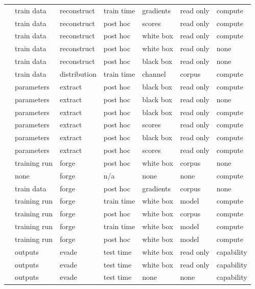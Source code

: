 \begin{landscape}
\begin{longtable}{rllllll}
\cite{BDJV22} & train data & reconstruct & train time & gradients & read only & compute \\
\cite{HU14} & train data & reconstruct & post hoc & scores & read only & compute \\
\cite{ML24} & train data & reconstruct & post hoc & white box & read only & compute \\
\cite{BCH22} & train data & reconstruct & post hoc & white box & read only & none \\
\cite{WLBZ25} & train data & reconstruct & post hoc & black box & read only & none \\
\cite{XSD24} & train data & distribution & train time & channel & corpus & compute \\
\cite{CCGJY19} & parameters & extract & post hoc & black box & read only & compute \\
\cite{SSEP24} & parameters & extract & post hoc & black box & read only & none \\
\cite{DKLP22} & parameters & extract & post hoc & black box & read only & compute \\
\cite{CJM20} & parameters & extract & post hoc & scores & read only & compute \\
\cite{JCBKP20} & parameters & extract & post hoc & black box & read only & compute \\
\cite{CCHRSS24} & parameters & extract & post hoc & scores & read only & compute \\
\cite{TJSP22} & training run & forge & post hoc & white box & corpus & none \\
\cite{DQW22} & none & forge & n/a & none & none & compute \\
\cite{KCC23} & train data & forge & post hoc & gradients & corpus & none \\
\cite{ZFWCSXZ26} & training run & forge & train time & white box & model & compute \\
\cite{FJTYCDCP23} & training run & forge & post hoc & white box & corpus & compute \\
\cite{DJYWWMNL26} & training run & forge & train time & white box & model & compute \\
\cite{JYCDTCP21} & training run & forge & post hoc & white box & model & compute \\
\cite{TCBM20} & outputs & evade & test time & white box & read only & capability \\
\cite{CGBSHC22} & outputs & evade & test time & white box & read only & capability \\
\cite{SLDLN25} & outputs & evade & test time & none & none & capability \\

\end{longtable}
\end{landscape}
